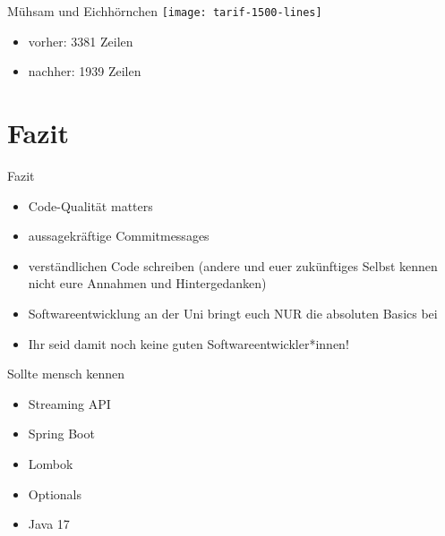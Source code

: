 \documentclass{beamer}
\begin{document}
\begin{frame}{Mühsam und Eichhörnchen}
  \texttt{[image: tarif-1500-lines]}\pause
  \vfill
  \begin{itemize}
    \item vorher: 3381 Zeilen \pause
    \item nachher: 1939 Zeilen
  \end{itemize}
\end{frame}

\section{Fazit}
\begin{frame}{Fazit}
  \begin{itemize}
    \item Code-Qualität matters
    \item aussagekräftige Commitmessages
    \item verständlichen Code schreiben (andere und euer zukünftiges Selbst kennen nicht eure Annahmen und Hintergedanken)
    \item Softwareentwicklung an der Uni bringt euch NUR die absoluten Basics bei
    \item Ihr seid damit noch keine guten Softwareentwickler*innen!
  \end{itemize}
\end{frame}

\begin{frame}{Sollte mensch kennen}
  \begin{itemize}
    \item Streaming API
    \item Spring Boot
    \item Lombok
    \item Optionals
    \item Java 17
  \end{itemize}
\end{frame}
	
\end{document}
